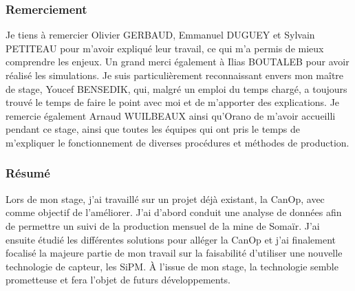

\subsubsection*{\centering Remerciement}

Je tiens à remercier Olivier GERBAUD, Emmanuel DUGUEY et Sylvain PETITEAU pour m'avoir expliqué leur travail, ce qui m'a permis de mieux comprendre les enjeux. Un grand merci également à Ilias BOUTALEB pour avoir réalisé les simulations. Je suis particulièrement reconnaissant envers mon maître de stage, Youcef BENSEDIK, qui, malgré un emploi du temps chargé, a toujours trouvé le temps de faire le point avec moi et de m'apporter des explications. Je remercie également Arnaud WUILBEAUX ainsi qu'Orano de m'avoir accueilli pendant ce stage, ainsi que toutes les équipes qui ont pris le temps de m'expliquer le fonctionnement de diverses procédures et méthodes de production.



\subsubsection*{\centering Résumé}




Lors de mon stage, j'ai travaillé sur un projet déjà existant, la CanOp, avec comme objectif de l'améliorer. J'ai d'abord conduit une analyse de données afin de permettre un suivi de la production mensuel de la mine de Somaïr. J'ai ensuite étudié les différentes solutions pour alléger la CanOp et j'ai finalement focalisé la majeure partie de mon travail sur la faisabilité d'utiliser une nouvelle technologie de capteur, les SiPM. À l’issue de mon stage, la technologie semble prometteuse et fera l'objet de futurs développements.





\vspace{50pt}
\tableofcontents
\listoffigures
\clearpage